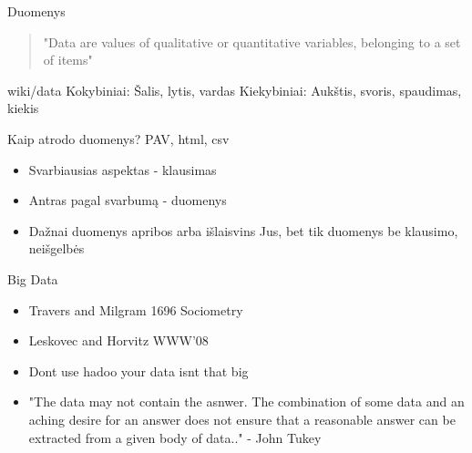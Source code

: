 \documentclass[11pt,xcolor=table]{beamer}
\begin{document}
\begin{frame}{Duomenys}
\begin{quote}
"Data are values of qualitative or quantitative variables, belonging to a set of items"
\end{quote}
wiki/data
Kokybiniai: Šalis, lytis, vardas
Kiekybiniai: Aukštis, svoris, spaudimas, kiekis
\end{frame}
\begin{frame}{Kaip atrodo duomenys?}
PAV, html, csv
\end{frame}
\begin{frame}
\begin{itemize}
\item Svarbiausias aspektas - klausimas
\item Antras pagal svarbumą - duomenys
\item Dažnai duomenys apribos arba išlaisvins Jus, bet tik duomenys be klausimo, neišgelbės
\end{itemize}
\end{frame}
\begin{frame}{Big Data}
\begin{itemize}
\item Travers and Milgram 1696 Sociometry
\item Leskovec and Horvitz WWW'08
\item Dont use hadoo your data isnt that big
\item "The data may not contain the asnwer. The combination of some data and an aching desire for an answer does not ensure that a reasonable answer can be extracted from a given body of data.." -  John Tukey
\end{itemize}
\end{frame}

\end{document}
